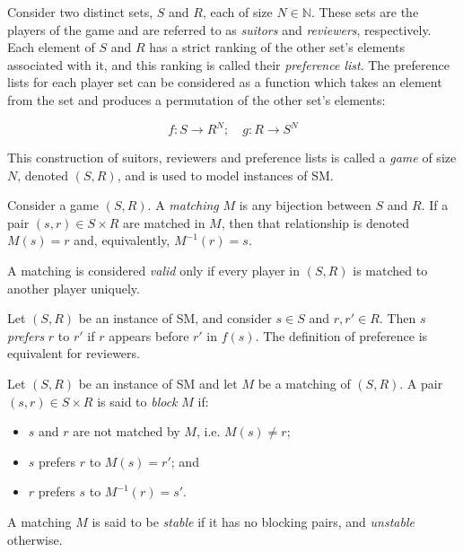 \begin{definition}\label{def:sm_game}
    Consider two distinct sets, \(S\) and \(R\), each of size \(N \in \mathbb
    N\). These sets are the players of the game and are referred to as
    \emph{suitors} and \emph{reviewers}, respectively. Each element of \(S\) and
    \(R\) has a strict ranking of the other set's elements associated with it,
    and this ranking is called their \emph{preference list}. The preference
    lists for each player set can be considered as a function which takes an
    element from the set and produces a permutation of the other set's elements:

    \begin{equation}
        f: S \to R^N; \quad g: R \to S^N
    \end{equation}

    This construction of suitors, reviewers and preference lists is called a
    \emph{game} of size \(N\), denoted \((S, R)\), and is used to
    model instances of SM.
\end{definition}

\begin{definition}\label{def:sm_matching}
    Consider a game \((S, R)\). A \emph{matching} \(M\) is any
    bijection between \(S\) and \(R\). If a pair \((s, r) \in S
    \times R\) are matched in \(M\), then that relationship is denoted \(M(s) =
    r\) and, equivalently, \(M^{-1}(r) = s\).

    A matching is considered \emph{valid} only if every player in \((S, R)\)
    is matched to another player uniquely.
\end{definition}

\begin{definition}\label{def:sm_preference}
    Let \((S, R)\) be an instance of SM, and consider \(s \in S\) and
    \(r, r' \in R\). Then \(s\) \emph{prefers} \(r\) to \(r'\) if \(r\) appears
    before \(r'\) in \(f(s)\). The definition of preference is equivalent for
    reviewers.
\end{definition}

\begin{definition}\label{def:sm_blocking}
    Let \((S, R)\) be an instance of SM and let \(M\) be a matching of \((S,
    R)\). A pair \((s, r) \in S \times R\) is said to \emph{block} \(M\) if:

    \begin{itemize}
        \item \(s\) and \(r\) are not matched by \(M\), i.e. \(M(s) \neq r\);
        \item \(s\) prefers \(r\) to \(M(s) = r'\); and
        \item \(r\) prefers \(s\) to \(M^{-1}(r) = s'\).
    \end{itemize}

    A matching \(M\) is said to be \emph{stable} if it has no blocking pairs,
    and \emph{unstable} otherwise.
\end{definition}

